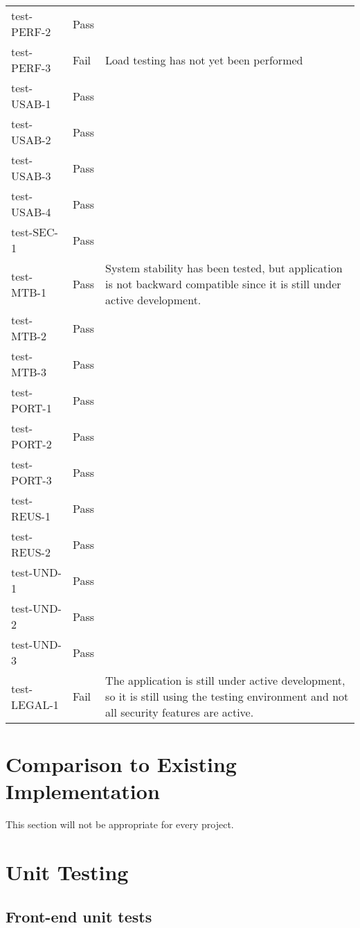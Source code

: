 \documentclass[12pt, titlepage]{article}
\begin{document}
\begin{longtable}{>{\centering\arraybackslash}p{} >{\centering\arraybackslash}p{} >{\centering\arraybackslash}p{}}
    test-PERF-2 & Pass &  \\
    test-PERF-3 & Fail & Load testing has not yet been performed \\
    \midrule
    test-USAB-1 & Pass &  \\
    test-USAB-2 & Pass &  \\
    test-USAB-3 & Pass &  \\
    test-USAB-4 & Pass &  \\
    \midrule
    test-SEC-1 & Pass &  \\
    \midrule
    test-MTB-1 & Pass & System stability has been tested, but application is not
    backward compatible since it is still under active development. \\
    test-MTB-2 & Pass &  \\
    test-MTB-3 & Pass &  \\
    \midrule
    test-PORT-1 & Pass &  \\
    test-PORT-2 & Pass &  \\
    test-PORT-3 & Pass &  \\
    \midrule
    test-REUS-1 & Pass &  \\
    test-REUS-2 & Pass &  \\
    \midrule
    test-UND-1 & Pass &  \\
    test-UND-2 & Pass &  \\
    test-UND-3 & Pass &  \\
    \midrule
    test-LEGAL-1 & Fail & The application is still under active development, so
    it is still using the testing environment and not all security features are
    active. \\
    \bottomrule
\end{longtable}


	
\section{Comparison to Existing Implementation}	

This section will not be appropriate for every project.

\section{Unit Testing}

\subsection{Front-end unit tests}
\end{document}
